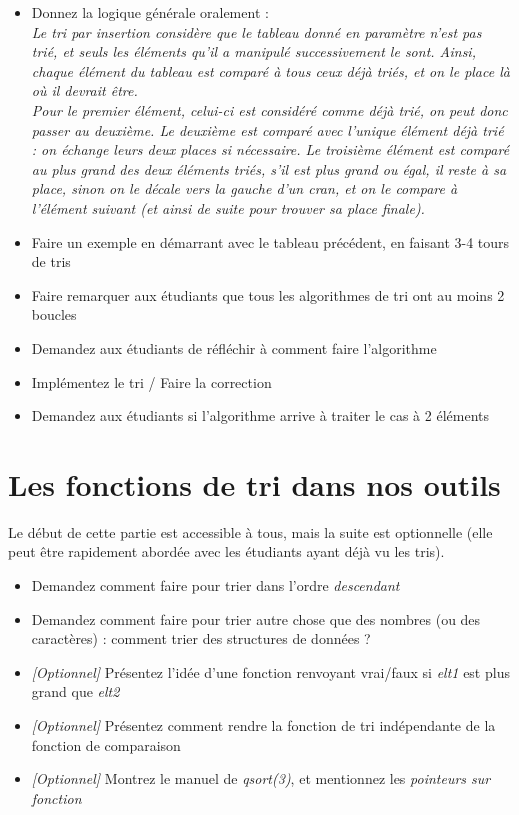 \documentclass[11pt,a4paper]{article}
\begin{document}
\begin{itemize}
\item Donnez la logique générale oralement : \\
  \og \textit{Le tri par insertion considère que le tableau donné en paramètre n'est pas trié, et seuls les éléments qu'il a manipulé successivement le sont. Ainsi, chaque élément du tableau est comparé à tous ceux déjà triés, et on le place là où il devrait être.} \fg{} \\
  \og \textit{Pour le premier élément, celui-ci est considéré comme déjà trié, on peut donc passer au deuxième. Le deuxième est comparé avec l'unique élément déjà trié : on échange leurs deux places si nécessaire. Le troisième élément est comparé au plus grand des deux éléments triés, s'il est plus grand ou égal, il reste à sa place, sinon on le décale vers la gauche d'un cran, et on le compare à l'élément suivant (et ainsi de suite pour trouver sa place finale).} \fg{} \\
\item Faire un exemple en démarrant avec le tableau précédent, en faisant 3-4 tours de tris \\
\item Faire remarquer aux étudiants que tous les algorithmes de tri ont au moins 2 boucles \\
\item Demandez aux étudiants de réfléchir à comment faire l'algorithme \\
\item Implémentez le tri / Faire la correction \\
\item Demandez aux étudiants si l'algorithme arrive à traiter le cas à 2 éléments
\end{itemize}



\section{Les fonctions de tri dans nos outils}

Le début de cette partie est accessible à tous, mais la suite est optionnelle (elle peut être rapidement abordée avec les étudiants ayant déjà vu les tris).

\begin{itemize}
\item Demandez comment faire pour trier dans l'ordre \textit{descendant}
\item Demandez comment faire pour trier autre chose que des nombres (ou des caractères) : comment trier des structures de données ?
\item \textit{[Optionnel]} Présentez l'idée d'une fonction renvoyant vrai/faux si \textit{elt1} est plus grand que \textit{elt2}
\item \textit{[Optionnel]} Présentez comment rendre la fonction de tri indépendante de la fonction de comparaison
\item \textit{[Optionnel]} Montrez le manuel de \textit{qsort(3)}, et mentionnez les \textit{pointeurs sur fonction}
\end{itemize}
\end{document}
